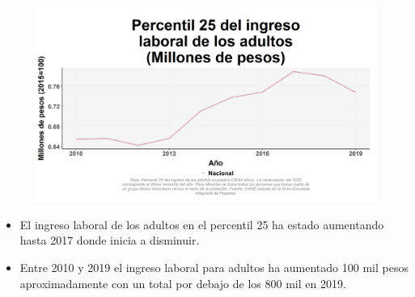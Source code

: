     \begin{figure}[H]
        \caption[Percentil 25 del ingreso laboral de los adultos a nivel nacional ]{\label{inglab25adu_nal_trend} }
        \begin{center}
        \includegraphics[width=\textwidth,keepaspectratio]{img/var_10_trend.png}
        \end{center}
    \end{figure}
            \begin{itemize}
                \item El ingreso laboral de los adultos en el percentil 25 ha estado aumentando hasta 2017 donde inicia a disminuir.
                \item Entre 2010 y 2019 el ingreso laboral para adultos ha aumentado 100 mil pesos aproximadamente con un total por debajo de los 800 mil en 2019.
                \end{itemize}

